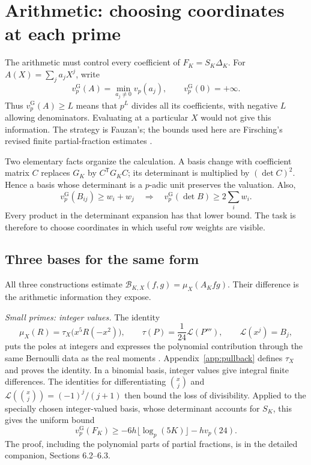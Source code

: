\section{Arithmetic: choosing coordinates at each prime}
\label{sec:local-arithmetic}

The arithmetic must control every coefficient of \(F_K=S_K\Delta_K\).
For \(A(X)=\sum_j a_jX^j\), write
\[
 v_p^{\mathrm G}(A)=\min_{a_j\ne0}v_p(a_j),\qquad
 v_p^{\mathrm G}(0)=+\infty.
\]
Thus \(v_p^{\mathrm G}(A)\ge L\) means that \(p^L\) divides all its
coefficients, with negative \(L\) allowing denominators. Evaluating
at a particular \(X\) would not give this information.
The strategy is Fauzan's; the bounds used here are Firsching's revised
finite partial-fraction estimates
\cite[Sections 3--4]{fauzan}\cite[\texttt{Arith/}, \texttt{Norm.lean}]{firsching}.

Two elementary facts organize the calculation. A basis change with
coefficient matrix \(C\) replaces \(G_K\) by \(C^{\mathsf T}G_KC\);
its determinant is multiplied by \((\det C)^2\).
Hence a basis whose determinant is a \(p\)-adic unit preserves the
valuation. Also,
\begin{equation}\label{arith:detweights}
 v_p^{\mathrm G}(B_{ij})\ge w_i+w_j
 \quad\Longrightarrow\quad
 v_p^{\mathrm G}(\det B)\ge2\sum_iw_i.
\end{equation}
Every product in the determinant expansion has that lower bound.
The task is therefore to choose coordinates in which useful row
weights are visible.

\subsection{Three bases for the same form}

All three constructions estimate
\(\mathcal B_{K,X}(f,g)=\mu_X(A_Kfg)\).
Their difference is the arithmetic information they expose.

\emph{Small primes: integer values.}
The identity
\[
 \mu_X(R)=\tau_X\bigl(x^5R(-x^2)\bigr),\qquad
 \tau(P)=\frac1{24}\mathcal L(P'''),\qquad \mathcal L(x^j)=B_j,
\]
puts the poles at integers and expresses the polynomial contribution
through the same Bernoulli data as the real moments
\cite[(3.1)]{fauzan}. Appendix~\ref{app:pullback} defines \(\tau_X\)
and proves the identity.
In a binomial basis, integer values give integral finite differences.
The identities for differentiating \(\binom{x}{j}\) and
\(\mathcal L(\binom{x}{j})=(-1)^j/(j+1)\) then bound the loss of
divisibility. Applied to the specially chosen integer-valued basis,
whose determinant accounts for \(S_K\), this gives the uniform bound
\begin{equation}\label{arith:small}
 v_p^{\mathrm G}(F_K)\ge
 -6h\lfloor\log_p(5K)\rfloor-hv_p(24).
\end{equation}
The proof, including the polynomial parts of partial fractions, is
in the detailed companion, Sections 6.2--6.3.

